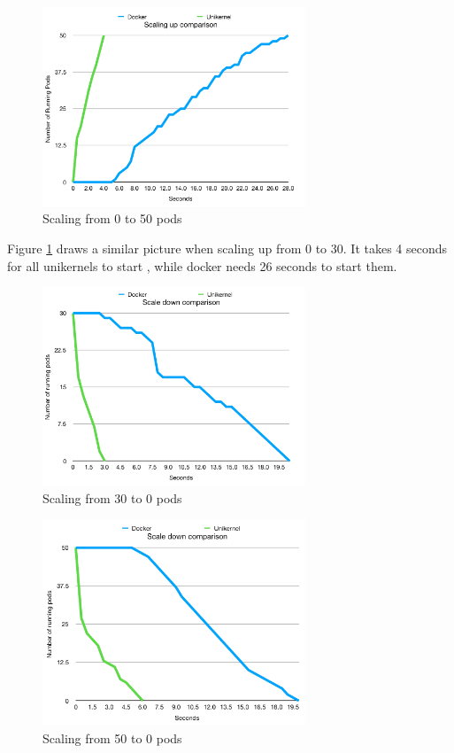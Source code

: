 \begin{figure}[htpb]
  \centering
  \includegraphics[width=0.7\textwidth]{figures/scales/scale-up-50.png}
  \caption{Scaling from 0 to 50 pods } \label{fig:scale-up-50}
\end{figure}
  
Figure \ref{fig:scale-up-50} draws a similar picture when scaling up from 0 to 30. It takes 4 seconds for all unikernels to start , while docker needs 26 seconds to start them.

\begin{figure}[htpb]
  \centering
  \includegraphics[width=0.7\textwidth]{figures/scales/scale-down-30.png}
  \caption{Scaling from 30 to 0 pods } \label{fig:scale-down-30}
\end{figure}

\begin{figure}[htpb]
  \centering
  \includegraphics[width=0.7\textwidth]{figures/scales/scale-down-50.png}
  \caption{Scaling from 50 to 0 pods } \label{fig:scale-down-50}
\end{figure}



